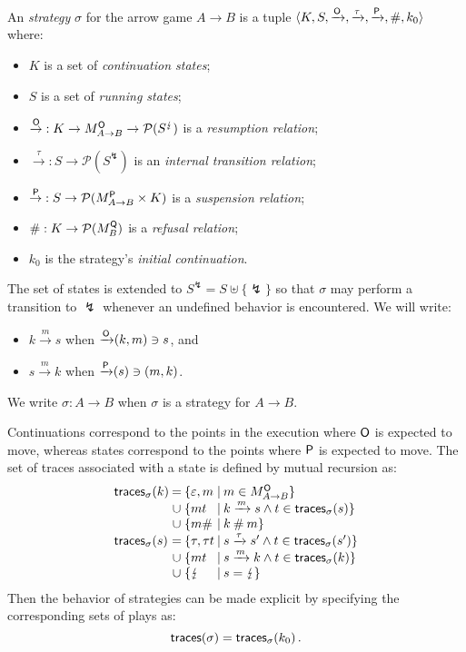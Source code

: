 \begin{definition} %
\label{def:strat}
An \emph{strategy} $\sigma$ for the arrow game $A \rightarrow B$
is a tuple
$\langle K, S,
{\xrightarrow{ \mathsf{O} } },
{\xrightarrow{\tau}},
{\xrightarrow{ \mathsf{P} } },
 \#, k_0 \rangle$
where:
\begin{itemize}
  \item $K$ is a set of \emph{continuation states};
  \item $S$ is a set of \emph{running states};
  \item ${\stackrel{ \mathsf{O} }{\rightarrow}} :
         K \rightarrow
         M_{A \rightarrow B}^{ \mathsf{O} } \rightarrow
         \mathcal{P}(S^\lightning)$
    is a \emph{resumption relation};
  \item ${\stackrel{\tau}{\rightarrow}} :
         S \rightarrow \mathcal{P}(S^\lightning)$
    is an \emph{internal transition relation};
  \item ${\stackrel{ \mathsf{P} }{\rightarrow}} :
         S \rightarrow \mathcal{P}(M_{A \rightarrow B}^{ \mathsf{P} } \times K)$
    is a \emph{suspension relation};
  \item ${\#} : K \rightarrow \mathcal{P}(M_B^{ \mathsf{Q} })$
    is a \emph{refusal relation};
  \item $k_0$
    is the strategy's \emph{initial continuation}.
\end{itemize}
The set of states is extended to $S^\lightning = S \uplus \{\lightning\}$
so that $\sigma$ may perform a transition to $\lightning$
whenever an undefined behavior is encountered.
We will write:
\begin{itemize}
  \item $k \xrightarrow{m} s$ when ${\xrightarrow{ \mathsf{O} } }(k, m) \ni s$, and
  \item $s \xrightarrow{m} k$ when ${\xrightarrow{ \mathsf{P} } }(s) \ni (m, k)$.
\end{itemize}
We write $\sigma : A \rightarrow B$ when $\sigma$ is a strategy
for $A \rightarrow B$.
\end{definition}

Continuations correspond to
the points in the execution where $ \mathsf{O} $ is expected to move,
whereas states correspond to
the points where $ \mathsf{P} $ is expected to move.
The set of traces associated with a state is
defined by mutual recursion as:
\[
  \begin{array}{l@{\:}c@{\:\{}l@{\:\mid\:}l}
    \kw{traces}_\sigma(k) & = & \varepsilon, m &
      m \in M_{A \rightarrow B}^\kw{O} \} \\
    & \cup & m t &
      k \xrightarrow{m} s \wedge t \in \kw{traces}_\sigma(s) \} \\
    & \cup & m \# &
      k \: \# \: m \} \\
    \kw{traces}_\sigma(s) & = & \tau, \tau t &
      s \xrightarrow{\tau} s' \wedge t \in \kw{traces}_\sigma(s') \} \\
    & \cup & m t &
      s \xrightarrow{m} k \wedge t \in \kw{traces}_\sigma(k) \} \\
    & \cup & \lightning & s = \lightning \}
  \end{array}
\]
Then the behavior of strategies can be made explicit
by specifying the corresponding sets of plays as:
\[
   \mathsf{traces} (\sigma) =  \mathsf{traces} _\sigma(k_0) \,.
\]

